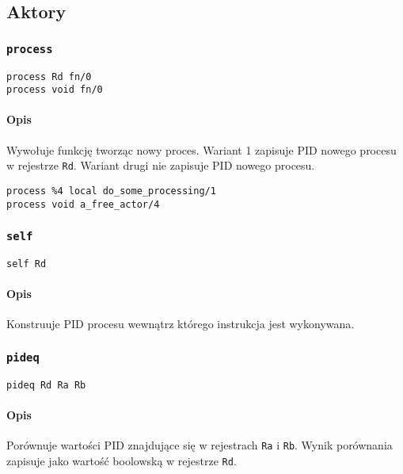 \subsection{Aktory}
\label{viua_vm_ops_actor}

\subsubsection{\texttt{process}}

\begin{lstlisting}
process Rd fn/0
process void fn/0
\end{lstlisting}

\paragraph*{Opis}

Wywołuje funkcję tworząc nowy proces.
Wariant 1 zapisuje PID nowego procesu w rejestrze \texttt{Rd}.
Wariant drugi nie zapisuje PID nowego procesu.
\begin{lstlisting}
process %4 local do_some_processing/1
process void a_free_actor/4
\end{lstlisting}

\subsubsection{\texttt{self}}

\begin{lstlisting}
self Rd
\end{lstlisting}

\paragraph*{Opis} Konstruuje PID procesu wewnątrz którego instrukcja jest
wykonywana.

\subsubsection{\texttt{pideq}}

\begin{lstlisting}
pideq Rd Ra Rb
\end{lstlisting}

\paragraph*{Opis} Porównuje wartości PID znajdujące się w rejestrach \texttt{Ra}
i \texttt{Rb}. Wynik porównania zapisuje jako wartość boolowską w rejestrze
\texttt{Rd}.

